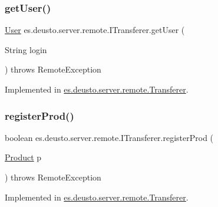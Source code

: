 \subsubsection{\texorpdfstring{get\+User()}{getUser()}}
{\footnotesize\ttfamily \hyperlink{classes_1_1deusto_1_1server_1_1db_1_1data_1_1_user}{User} es.\+deusto.\+server.\+remote.\+I\+Transferer.\+get\+User (\begin{DoxyParamCaption}\item[{String}]{login }\end{DoxyParamCaption}) throws Remote\+Exception}



Implemented in \hyperlink{classes_1_1deusto_1_1server_1_1remote_1_1_transferer_a16976959aeb3080244422aeac061a23b}{es.\+deusto.\+server.\+remote.\+Transferer}.

\mbox{\label{interfacees_1_1deusto_1_1server_1_1remote_1_1_i_transferer_a06629c7021aae4d2ce1a449726102ded}} 
\subsubsection{\texorpdfstring{register\+Prod()}{registerProd()}}
{\footnotesize\ttfamily boolean es.\+deusto.\+server.\+remote.\+I\+Transferer.\+register\+Prod (\begin{DoxyParamCaption}\item[{\hyperlink{classes_1_1deusto_1_1server_1_1db_1_1data_1_1_product}{Product}}]{p }\end{DoxyParamCaption}) throws Remote\+Exception}



Implemented in \hyperlink{classes_1_1deusto_1_1server_1_1remote_1_1_transferer_a64c1f3b57b74106df83335b124937afe}{es.\+deusto.\+server.\+remote.\+Transferer}.

\mbox{\label{interfacees_1_1deusto_1_1server_1_1remote_1_1_i_transferer_ab805207e578865de5bf2e69ca8942344}} 
